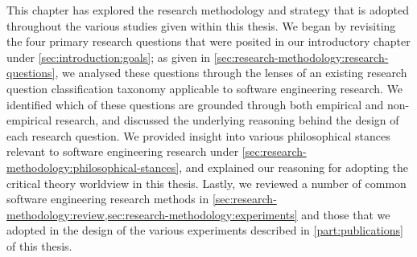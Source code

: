 This chapter has explored the research methodology and strategy that is adopted throughout the various studies given within this thesis. We began by revisiting the four primary research questions that were posited in our introductory chapter under \cref{sec:introduction:goals}; as given in \cref{sec:research-methodology:research-questions}, we analysed these questions through the lenses of an existing research question classification taxonomy applicable to software engineering research. We identified which of these questions are grounded through both empirical and non-empirical research, and discussed the underlying reasoning behind the design of each research question. We provided insight into various philosophical stances relevant to software engineering research under \cref{sec:research-methodology:philosophical-stances}, and explained our reasoning for adopting the critical theory worldview in this thesis. Lastly, we reviewed a number of common software engineering research methods in \cref{sec:research-methodology:review,sec:research-methodology:experiments} and those that we adopted in the design of the various experiments described in \cref{part:publications} of this thesis. 